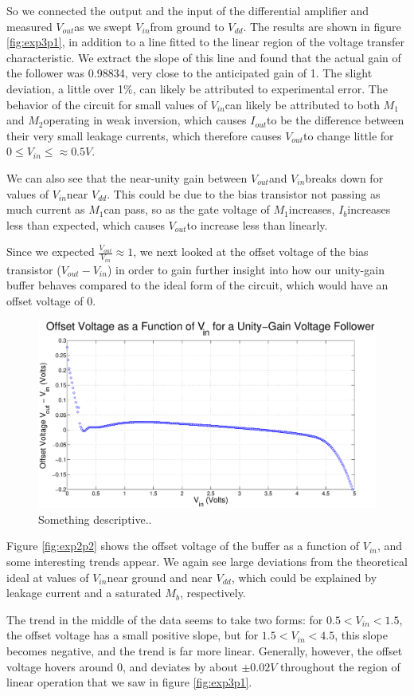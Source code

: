 \documentclass{article}
\newcommand{\Vdd}{{$V_{dd}$}}
\newcommand{\Iout}{{$I_{out}$}}
\newcommand{\Vout}{{$V_{out}$}}
\newcommand{\Vin}{{$V_{in}$}}
\newcommand{\Ib}{{$I_{b}$}}
\newcommand{\Mone}{{$M_{1}$}}
\newcommand{\Mtwo}{{$M_{2}$}}
\newcommand{\Mb}{{$M_{b}$}}
\begin{document}
So we connected the output and the input of the differential amplifier and measured \Vout as we swept \Vin from ground to \Vdd. The results are shown in figure \ref{fig:exp3p1}, in addition to a line fitted to the linear region of the voltage transfer characteristic. We extract the slope of this line and found that the actual gain of the follower was 0.98834, very close to the anticipated gain of 1. The slight deviation, a little over 1\%, can likely be attributed to experimental error. The behavior of the circuit for small values of \Vin can likely be attributed to both \Mone and \Mtwo operating in weak inversion, which causes \Iout to be the difference between their very small leakage currents, which therefore causes \Vout to change little for $0 \leq V_{in} \leq \approx 0.5 V.$

We can also see that the near-unity gain between \Vout and \Vin breaks down for values of \Vin near \Vdd. This could be due to the bias transistor not passing as much current as \Mone can pass, so as the gate voltage of \Mone increases, \Ib increases less than expected, which causes \Vout to increase less than linearly.

Since we expected $\frac{V_{out}}{V_{in}} \approx 1$, we next looked at the offset voltage of the bias transistor ($V_{out} - V_{in}$) in order to gain further insight into how our unity-gain buffer behaves compared to the ideal form of the circuit, which would have an offset voltage of 0.

\begin{figure}[H]
\centering
\includegraphics[width=\linewidth]{../Figures/Exp3P2.eps}
\caption{Something descriptive..}
\label{fig:exp3p2}
\end{figure}

Figure \ref{fig:exp2p2} shows the offset voltage of the buffer as a function of \Vin, and some interesting trends appear. We again see large deviations from the theoretical ideal at values of \Vin near ground and near \Vdd, which could be explained by leakage current and a saturated \Mb, respectively.

The trend in the middle of the data seems to take two forms: for $0.5 < V_{in} < 1.5$, the offset voltage has a small positive slope, but for $1.5 < V_{in} < 4.5$, this slope becomes negative, and the trend is far more linear. Generally, however, the offset voltage hovers around 0, and deviates by about $\pm 0.02 V$ throughout the region of linear operation that we saw in figure \ref{fig:exp3p1}. 
\end{document}
